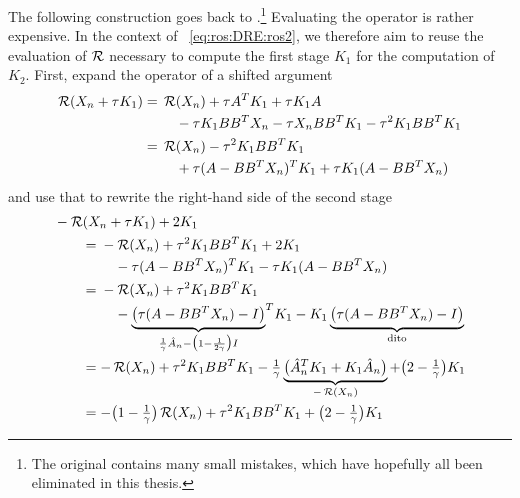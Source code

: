 The following construction goes back to \cite{Mena2007,MPIMD12-13}.\footnote{%
  The original contains many small mistakes,
  which have hopefully all been eliminated in this thesis.
}
Evaluating the \Riccati operator is rather expensive.
In the context of ~\eqref{eq:ros:DRE:ros2},
we therefore aim to reuse the evaluation of $\operatorname{\mathcal R}$ necessary to compute the first stage $K_1$
for the computation of $K_2$.
First, expand the \Riccati operator of a shifted argument
\begin{subequations}
\begin{align}
  \Ricc(X_n + \tau K_1)
  &= \begin{multlined}[t]
    \Ricc(X_n) + \tau A^\T K_1 + \tau K_1 A \\
    - \tau K_1 BB^\T X_n - \tau X_n BB^\T K_1 - \tau^2 K_1 BB^\T K_1
  \end{multlined} \\
  &= \begin{multlined}[t]
    \Ricc(X_n) - \tau^2 K_1 BB^\T K_1 \\
    + \tau(A - BB^\T X_n)^\T K_1 + \tau K_1 (A - BB^\T X_n)
  \end{multlined}
\end{align}
\end{subequations}
and use that to rewrite the right-hand side of the second stage
\begin{subequations}
\begin{align}
  \MoveEqLeft
  -\Ricc(X_n + \tau K_1) + 2K_1
  \nonumber \\
  &= \begin{multlined}[t]
    -\Ricc(X_n) + \tau^2 K_1 BB^\T K_1 + 2K_1 \\
    - \tau(A - BB^\T X_n)^\T K_1 - \tau K_1 (A - BB^\T X_n)
  \end{multlined} \\
  &= \begin{multlined}[t]
    -\Ricc(X_n) + \tau^2 K_1 BB^\T K_1 \\
    - \underbrace{
      \big(\tau(A - BB^\T X_n) - I\big)
    }_{\frac{1}{\gamma} \hat{A}_n - \big( 1-\frac{1}{2\gamma} \big) I}
    \!{\vphantom{\big(}}^\T
    K_1
    - K_1
    \underbrace{
      \big(\tau(A - BB^\T X_n) - I\big)
    }_{\text{dito}}
  \end{multlined} \\
  &=
  -\Ricc(X_n) + \tau^2 K_1 BB^\T K_1
  -\tfrac{1}{\gamma}
  \underbrace{
    \big( \hat{A}_n^\T K_1 + K_1 \hat{A}_n \big)
  }_{-\Ricc(X_n)}
  + \big( 2-\tfrac{1}{\gamma} \big) K_1 \\
  &= -\big(1-\tfrac{1}{\gamma}\big) \Ricc(X_n)
  + \tau^2 K_1 BB^\T K_1
  + \big( 2-\tfrac{1}{\gamma} \big) K_1
\end{align}
\end{subequations}
